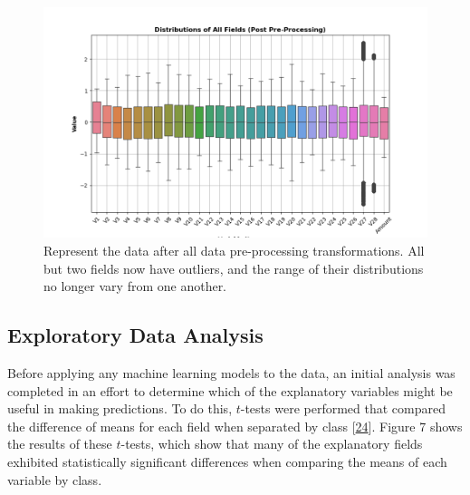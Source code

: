 \documentclass[11pt, oneside]{article}   	%
\begin{document}
\begin{figure}[h!]
    \centering
    \includegraphics[width=1.0\textwidth]{figures/fig_6.png}
    \captionsetup{font=small} 
    \caption{Represent the data after all data pre-processing transformations. All but two fields now have outliers, and the range of their distributions no longer vary from one another.}
    \label{fig6}
\end{figure}




\subsection{Exploratory Data Analysis}

Before applying any machine learning models to the data, an initial analysis was completed in an effort to determine which of the explanatory variables might be useful in making predictions. To do this, $t$-tests were performed that compared the difference of means for each field when separated by class [\href{https://doi.org/10.2307/2331554}{24}]. Figure 7 shows the results of these $t$-tests, which show that many of the explanatory fields exhibited statistically significant differences when comparing the means of each variable by class.
\end{document}
